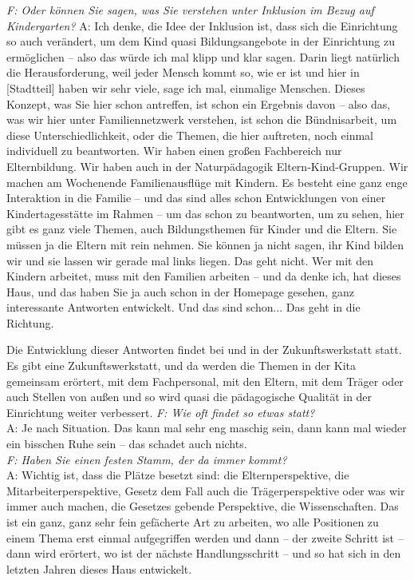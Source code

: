 \begin{linenumbers*}
\emph{F: Oder können Sie sagen, was Sie verstehen unter Inklusion im Bezug auf Kindergarten?}
A: Ich denke, die Idee der Inklusion ist, dass sich die Einrichtung so auch verändert, um dem Kind quasi Bildungsangebote in der Einrichtung zu ermöglichen -- also das würde ich mal klipp und klar sagen. Darin liegt natürlich die Herausforderung, weil jeder Mensch kommt so, wie er ist und hier in [Stadtteil] haben wir sehr viele, sage ich mal, einmalige Menschen. Dieses Konzept, was Sie hier schon antreffen, ist schon ein Ergebnis davon -- also das, was wir hier unter Familiennetzwerk verstehen, ist schon die Bündnisarbeit, um diese Unterschiedlichkeit, oder die Themen, die hier auftreten, noch einmal individuell zu beantworten. 
Wir haben einen großen Fachbereich nur Elternbildung. Wir haben auch in der Naturpädagogik Eltern-Kind-Gruppen. Wir machen am Wochenende Familienausflüge mit Kindern. Es besteht eine ganz enge Interaktion in die Familie -- und das sind alles schon Entwicklungen von einer Kindertagesstätte im Rahmen -- um das schon zu beantworten, um zu sehen, hier gibt es ganz viele Themen, auch Bildungsthemen für Kinder und die Eltern.
Sie müssen ja die Eltern mit rein nehmen. Sie können ja nicht sagen, ihr Kind bilden wir und sie lassen wir gerade mal links liegen. Das geht nicht. Wer mit den Kindern arbeitet, muss mit den Familien arbeiten -- und da denke ich, hat dieses Haus, und das haben Sie ja auch schon in der Homepage gesehen, ganz interessante Antworten entwickelt. Und das sind schon... Das geht in die Richtung.  

Die Entwicklung dieser Antworten findet bei und in der Zukunftswerkstatt statt. Es gibt eine Zukunftswerkstatt, und da werden die Themen in der Kita gemeinsam erörtert, mit dem Fachpersonal, mit den Eltern, mit dem Träger oder auch Stellen von außen und so wird quasi die pädagogische Qualität in der Einrichtung weiter verbessert.
\emph{F: Wie oft findet so etwas statt?}\\
A: Je nach Situation. Das kann mal sehr eng maschig sein, dann kann mal wieder ein bisschen Ruhe sein -- das schadet auch nichts.\\ 
\emph{F: Haben Sie einen festen Stamm, der da immer kommt?}\\
A: Wichtig ist, dass die Plätze besetzt sind: die Elternperspektive, die Mitarbeiterperspektive, Gesetz dem Fall auch die Trägerperspektive oder was wir immer auch machen, die Gesetzes gebende Perspektive, die Wissenschaften. Das ist ein ganz, ganz sehr fein gefächerte Art zu arbeiten, wo alle Positionen zu einem Thema erst einmal aufgegriffen werden und dann -- der zweite Schritt ist -- dann wird erörtert, wo ist der nächste Handlungsschritt -- und so hat sich in den letzten Jahren dieses Haus entwickelt. 


\end{linenumbers*}
